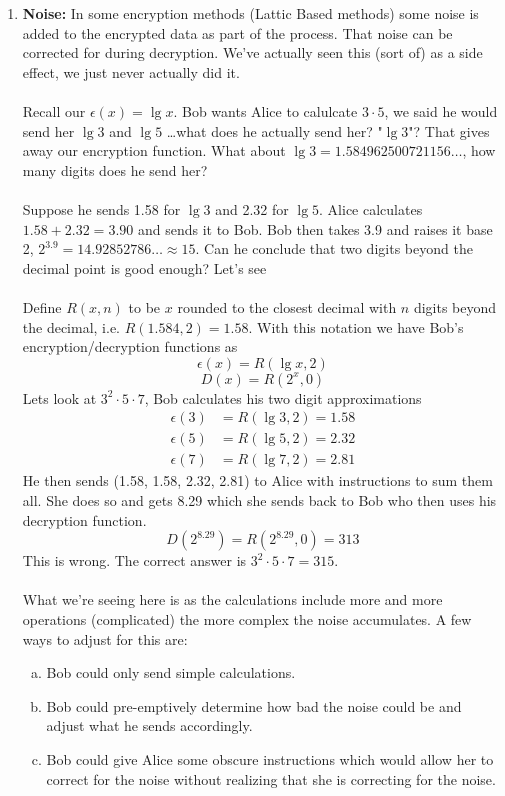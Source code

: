 \documentclass[class=article, crop=false]{standalone}
\begin{document}
\begin{enumerate}[1.]
	\item \textbf{Noise:}
	In some encryption methods (Lattic Based methods) some noise is added to the encrypted data as
	part of the process. That noise can be corrected for during decryption. We've actually seen this (sort of)
	as a side effect, we just never actually did it. \\\\
	Recall our $\epsilon(x) =\lg x$. Bob wants Alice to calulcate $3\cdot 5$, we said he would
	send her $\lg 3$ and $\lg 5$ \dots what does he actually send her? "$\lg 3$"? That gives away our encryption
	function. What about $\lg 3=1.584962500721156\ldots$, how many digits does he send her? \\\\
	Suppose he sends 1.58 for $\lg 3$ and 2.32 for $\lg 5$. Alice calculates $1.58 + 2.32=3.90$ and sends it to Bob.
	Bob then takes 3.9 and raises it base 2, $2^{3.9}=14.92852786\ldots\approx 15$. Can he conclude that two digits beyond
	the decimal point is good enough? Let's see \\\\
	Define $R(x,n)$ to be $x$ rounded to the closest decimal with $n$ digits beyond the decimal,
	i.e. $R(1.584, 2) = 1.58$. With this notation we have Bob's encryption/decryption functions as
	$$\epsilon(x) = R(\lg x, 2)$$
	$$D(x) = R(2^x, 0)$$
	Lets look at $3^2\cdot 5\cdot 7$, Bob calculates his two digit approximations
	\begin{align*}
		\epsilon(3) &= R(\lg 3, 2) = 1.58 \\
		\epsilon(5) &= R(\lg 5, 2) = 2.32 \\
		\epsilon(7) &= R(\lg 7, 2) = 2.81
	\end{align*}
	He then sends (1.58, 1.58, 2.32, 2.81) to Alice with instructions to sum them all.
	She does so and gets 8.29 which she sends back to Bob who then uses his decryption function.
	$$D(2^{8.29}) = R(2^{8.29}, 0) = 313$$
	This is wrong. The correct answer is $3^2\cdot 5\cdot 7 = 315$. \\\\
	What we're seeing here is as the calculations include more and more operations (complicated)
	the more complex the noise accumulates. A few ways to adjust for this are:
	\begin{enumerate}[(a)]
		\item Bob could only send simple calculations.
		\item Bob could pre-emptively determine how bad the noise could be and adjust what he sends accordingly.
		\item Bob could give Alice some obscure instructions which would allow her to correct for the noise without realizing
		that she is correcting for the noise.
	\end{enumerate}


\end{enumerate}
\end{document}
